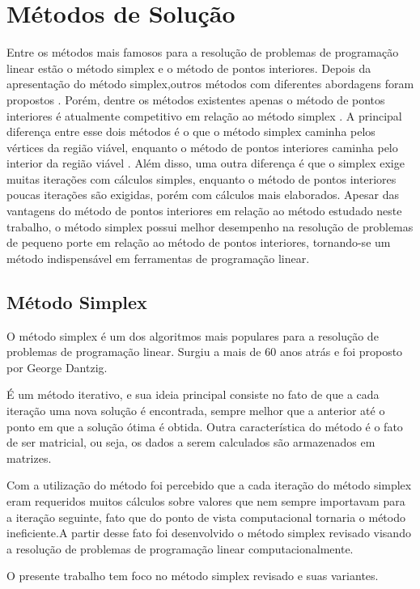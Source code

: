 \section{Métodos de Solução}
Entre os métodos mais famosos para a resolução de problemas de programação linear estão o método simplex  e o método de pontos interiores. 
Depois da apresentação do método simplex,outros métodos com diferentes abordagens foram propostos \cite{Todd}. Porém, dentre os métodos existentes apenas o método de pontos interiores é atualmente competitivo em relação ao método simplex . 
A principal diferença entre esse dois métodos é o que o método simplex caminha pelos vértices da região viável, enquanto o método de pontos interiores caminha pelo interior da região viável \cite{MaculanPI}. Além disso, uma outra diferença é que o simplex exige muitas iterações com cálculos simples, enquanto o método de pontos interiores poucas iterações são exigidas, porém com cálculos mais elaborados.
Apesar das vantagens do método de pontos interiores em relação ao método estudado neste trabalho, o método simplex possui melhor desempenho na resolução de problemas de pequeno porte em relação ao método de pontos interiores, tornando-se um método indispensável em ferramentas de programação linear.

\subsection{Método Simplex}
O método simplex é um dos algoritmos mais populares para a resolução de problemas de programação linear. Surgiu a mais de 60 anos atrás e foi proposto por George Dantzig.  

É um método iterativo, e sua ideia principal consiste no fato de que a cada iteração uma nova solução é encontrada, sempre melhor que a anterior até o ponto em que a solução ótima é obtida. Outra característica do método é o fato de ser matricial, ou seja, os dados a serem calculados são armazenados em matrizes.  

Com a utilização do método foi percebido que a cada iteração do método simplex eram requeridos muitos cálculos sobre valores que nem sempre importavam para a iteração seguinte, fato que do ponto de vista computacional tornaria o método ineficiente.A partir desse fato foi desenvolvido o método simplex revisado visando a resolução de problemas de programação linear computacionalmente.

O presente trabalho tem foco no método simplex revisado e suas variantes.

